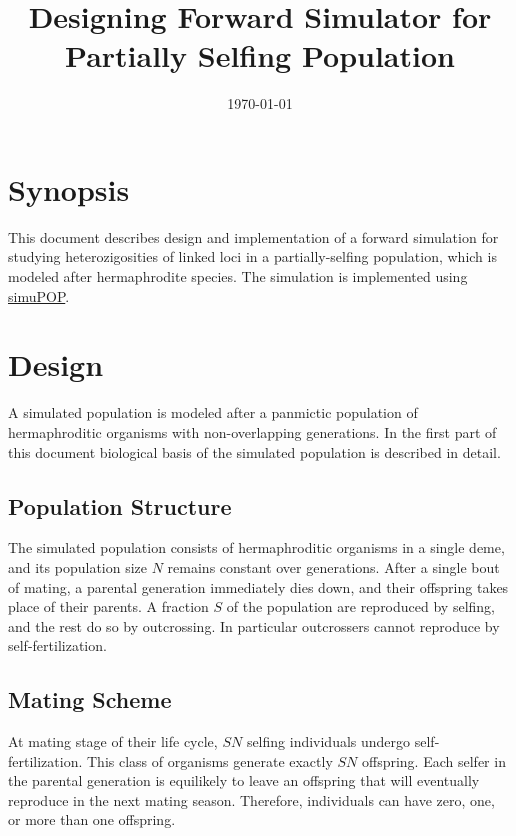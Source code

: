 \documentclass[12pt]{article}
\begin{document}
\title{Designing Forward Simulator for Partially Selfing Population}
\date{\today}
\maketitle

\section{Synopsis}
\label{sec:synopsis}

This document describes design and implementation of a forward
simulation for studying heterozigosities of linked loci in a
partially-selfing population, which is modeled after hermaphrodite
species.
The simulation is implemented using
\href{http://simupop.sourceforge.net/}{simuPOP}.

\section{Design}
\label{sec:design}

A simulated population is modeled after a panmictic population of
hermaphroditic organisms with non-overlapping generations.
In the first part of this document
biological basis of the simulated population is described in detail.

\subsection{Population Structure}
\label{sec:population-structure}

The simulated population consists of hermaphroditic organisms
in a single deme, and its population size \(N\) remains constant
over generations.
After a single bout of mating, a parental generation immediately dies
down, and their offspring takes place of their parents.
A fraction \(S\) of the population are reproduced by selfing,
and the rest do so by outcrossing.
In particular outcrossers cannot reproduce by self-fertilization.

\subsection{Mating Scheme}
\label{sec:mating-scheme}

At mating stage of their life cycle,
\(S N\) selfing individuals undergo self-fertilization.
This class of organisms generate exactly \(S N\) offspring.
Each selfer in the parental generation is equilikely to leave an
offspring that will eventually reproduce in the next mating season.
Therefore, individuals can have zero, one, or more than one offspring.
\end{document}

